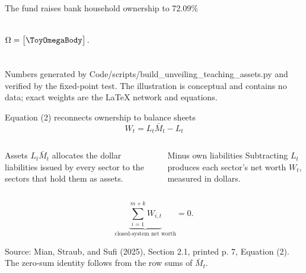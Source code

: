 \documentclass[aspectratio=169,11pt]{beamer}
\newcommand{\source}[1]{%
  \vfill
  {\color{MSSGray}\fontsize{6.5}{7.5}\selectfont #1\par}
}
\begin{document}
\begin{frame}{The fund raises bank household ownership to 72.09\%}
\begin{columns}[T,onlytextwidth]
    \vspace{-0.12cm}
    \[
      \Omega=
      \begin{bmatrix}\ToyOmegaBody\end{bmatrix}.
    \]
  \end{columns}
  \source{Numbers generated by Code/scripts/build\_unveiling\_teaching\_assets.py and verified by the fixed-point test. The illustration is conceptual and contains no data; exact weights are the LaTeX network and equations.}
\end{frame}

\begin{frame}{Equation (2) reconnects ownership to balance sheets}
  \[
    \boxed{
      W_t=L_t\bar M_t-L_t
    }
    \tag{2}
  \]
  \begin{columns}[T,onlytextwidth]
    \begin{block}{Assets}
      \(L_t\bar M_t\) allocates the dollar liabilities issued by every sector
      to the sectors that hold them as assets.
    \end{block}

    \begin{block}{Minus own liabilities}
      Subtracting \(L_t\) produces each sector's net worth \(W_t\), measured
      in dollars.
    \end{block}
  \end{columns}
  \vspace{0.3cm}
  \[
    \underbrace{\sum_{i=1}^{m+k}W_{i,t}}_{\text{closed-system net worth}}
    =
    0.
  \]
  \source{Source: Mian, Straub, and Sufi (2025), Section 2.1, printed p. 7, Equation (2). The zero-sum identity follows from the row sums of \(\bar M_t\).}
\end{frame}
\end{document}
